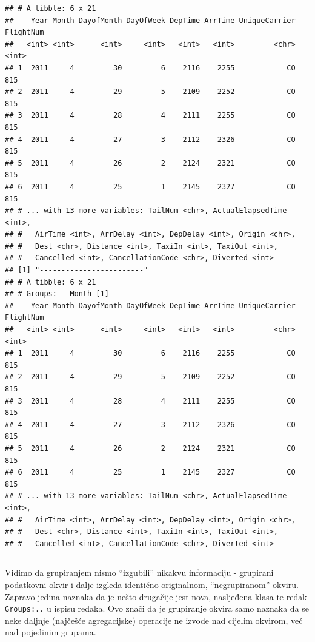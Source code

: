 \documentclass[]{book}
\theoremstyle{definition}
\theoremstyle{definition}
\theoremstyle{definition}
\theoremstyle{remark}
\begin{document}
\begin{verbatim}
## # A tibble: 6 x 21
##    Year Month DayofMonth DayOfWeek DepTime ArrTime UniqueCarrier FlightNum
##   <int> <int>      <int>     <int>   <int>   <int>         <chr>     <int>
## 1  2011     4         30         6    2116    2255            CO       815
## 2  2011     4         29         5    2109    2252            CO       815
## 3  2011     4         28         4    2111    2255            CO       815
## 4  2011     4         27         3    2112    2326            CO       815
## 5  2011     4         26         2    2124    2321            CO       815
## 6  2011     4         25         1    2145    2327            CO       815
## # ... with 13 more variables: TailNum <chr>, ActualElapsedTime <int>,
## #   AirTime <int>, ArrDelay <int>, DepDelay <int>, Origin <chr>,
## #   Dest <chr>, Distance <int>, TaxiIn <int>, TaxiOut <int>,
## #   Cancelled <int>, CancellationCode <chr>, Diverted <int>
## [1] "------------------------"
## # A tibble: 6 x 21
## # Groups:   Month [1]
##    Year Month DayofMonth DayOfWeek DepTime ArrTime UniqueCarrier FlightNum
##   <int> <int>      <int>     <int>   <int>   <int>         <chr>     <int>
## 1  2011     4         30         6    2116    2255            CO       815
## 2  2011     4         29         5    2109    2252            CO       815
## 3  2011     4         28         4    2111    2255            CO       815
## 4  2011     4         27         3    2112    2326            CO       815
## 5  2011     4         26         2    2124    2321            CO       815
## 6  2011     4         25         1    2145    2327            CO       815
## # ... with 13 more variables: TailNum <chr>, ActualElapsedTime <int>,
## #   AirTime <int>, ArrDelay <int>, DepDelay <int>, Origin <chr>,
## #   Dest <chr>, Distance <int>, TaxiIn <int>, TaxiOut <int>,
## #   Cancelled <int>, CancellationCode <chr>, Diverted <int>
\end{verbatim}

\begin{center}\rule{0.5\linewidth}{\linethickness}\end{center}

Vidimo da grupiranjem nismo ``izgubili'' nikakvu informaciju - grupirani
podatkovni okvir i dalje izgleda identično originalnom, ``negrupiranom''
okviru. Zapravo jedina naznaka da je nešto drugačije jest nova,
nasljeđena klasa te redak \texttt{Groups:..} u ispisu redaka. Ovo znači
da je grupiranje okvira samo naznaka da se neke daljnje (najčešće
agregacijske) operacije ne izvode nad cijelim okvirom, već nad pojedinim
grupama.
\end{document}
